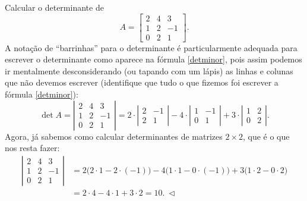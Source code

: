 \begin{ex}
Calcular o determinante de
\begin{equation}
A = \begin{bmatrix}
2 & 4 & 3  \\
1 & 2 & -1 \\
0 & 2 & 1
\end{bmatrix}.
\end{equation} A notação de ``barrinhas'' para o determinante é particularmente adequada para escrever o determinante como aparece na fórmula \eqref{detminor}, pois assim podemos ir mentalmente desconsiderando (ou tapando com um lápis) as linhas e colunas que não devemos escrever (identifique que tudo o que fizemos foi escrever a fórmula \eqref{detminor}):
\begin{equation}
\det A = \left| \begin{matrix}
2 & 4 & 3  \\
1 & 2 & -1 \\
0 & 2 & 1
\end{matrix} \right| = 2 \cdot \left| \begin{matrix}
 2 & -1 \\
 2 & 1
\end{matrix} \right| - 4 \cdot \left| \begin{matrix}
1 &  -1 \\
0 &  1
\end{matrix} \right| + 3 \cdot \left| \begin{matrix}
1 & 2  \\
0 & 2
\end{matrix} \right|.
\end{equation} Agora, já sabemos como calcular determinantes de matrizes $2 \times 2$, que é o que nos resta fazer:
\begin{equation}
\begin{split}
\left| \begin{matrix}
2 & 4 & 3  \\
1 & 2 & -1 \\
0 & 2 & 1
\end{matrix} \right| & = 2 \big( 2\cdot 1 - 2 \cdot (-1)  \big) - 4 \big( 1 \cdot 1 - 0 \cdot (-1) \big) + 3 \big( 1 \cdot 2 - 0 \cdot 2 \big) \\
                     & = 2 \cdot 4 - 4 \cdot 1 + 3 \cdot 2 = 10. \ \lhd
\end{split}
\end{equation}
\end{ex}


